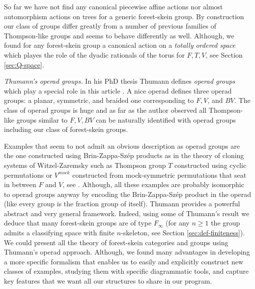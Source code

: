 \documentclass[a4paper, 12pt]{amsart}
\numberwithin{equation}{section}
\theoremstyle{definition}
\begin{document}
So far we have not find any canonical piecewise affine actions nor almost automorphism actions on trees for a generic forest-skein group. 
By construction our class of groups differ greatly from a number of previous families of Thompson-like groups and seems to behave differently as well.
Although, we found for any forest-skein group a canonical action on a {\it totally ordered space} which playes the role of the dyadic rationals of the torus for $F,T,V$, see Section \ref{sec:Q-space}.

{\it Thumann's operad groups.}
In his PhD thesis Thumann defines {\it operad groups} which play a special role in this article \cite{Thumann17}. 
A nice operad defines three operad groups: a planar, symmetric, and braided one corresponding to $F,V$, and $BV$.
The class of operad groups is huge and as far as the author observed all Thompson-like groups similar to $F,V,BV$ can be naturally identified with operad groups including our class of forest-skein groups.

Examples that seem to not admit an obvious description as operad groups are the one constructed using Brin-Zappa-Sz\'ep products as in the theory of cloning systems of Witzel-Zaremsky such as Thompson group $T$ constructed using cyclic permutations or $V^{mock}$ constructed from mock-symmetric permutations that seat in between $F$ and $V$, see \cite[Section 9]{Witzel-Zaremsky18}. Although, all these examples are probably isomorphic to operad groups anyway by encoding the Brin-Zappa-Sz\'ep product in the operad (like every group is the fraction group of itself).
%
Thumann provides a powerful abstract and very general framework.
Indeed, using some of Thumann's result we deduce that many forest-skein groups are of type $F_\infty$ (for any $n\geq 1$ the group admits a classifying space with finite $n$-skeleton, see Section \ref{sec:def-finiteness}).
We could present all the theory of forest-skein categories and groups using Thumann's operad approach. 
Although, we found many advantages in developing a more specific formalism that enables us to easily and explicitly construct new classes of examples, studying them with specific diagrammatic tools, and capture key features that we want all our structures to share in our program. 
\end{document}
